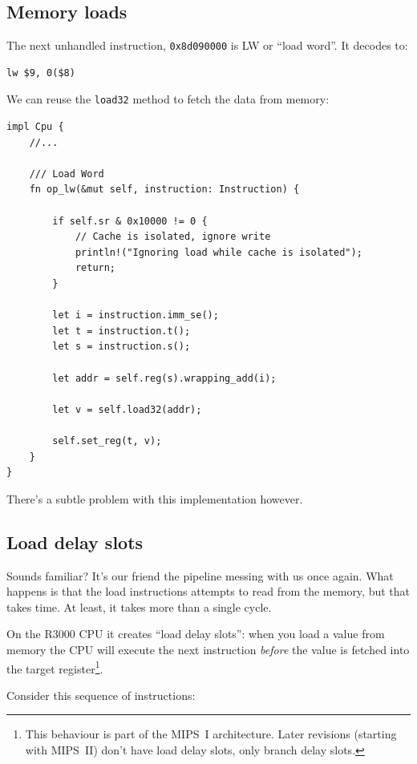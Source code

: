 \documentclass[a4paper]{article}
\newcommand{\code}[1] {\texttt{#1}}
\begin{document}
\subsection{Memory loads}

The next unhandled instruction, \code{0x8d090000} is LW or ``load
word''. It decodes to:

\begin{lstlisting}[language=assembly]
lw $9, 0($8)
\end{lstlisting}

We can reuse the \code{load32} method to fetch the data from memory:

\begin{lstlisting}
impl Cpu {
    //...

    /// Load Word
    fn op_lw(&mut self, instruction: Instruction) {

        if self.sr & 0x10000 != 0 {
            // Cache is isolated, ignore write
            println!("Ignoring load while cache is isolated");
            return;
        }

        let i = instruction.imm_se();
        let t = instruction.t();
        let s = instruction.s();

        let addr = self.reg(s).wrapping_add(i);

        let v = self.load32(addr);

        self.set_reg(t, v);
    }
}
\end{lstlisting}

There's a subtle problem with this implementation however.

\subsection{Load delay slots}

Sounds familiar? It's our friend the pipeline messing with us once
again. What happens is that the load instructions attempts to read
from the memory, but that takes time. At least, it takes more than a
single cycle.

On the R3000 CPU it creates ``load delay slots'': when you load a
value from memory the CPU will execute the next instruction
\emph{before} the value is fetched into the target
register\footnote{This behaviour is part of the MIPS~I
  architecture. Later revisions (starting with MIPS~II) don't
  have load delay slots, only branch delay slots.}.

Consider this sequence of instructions:
\end{document}
